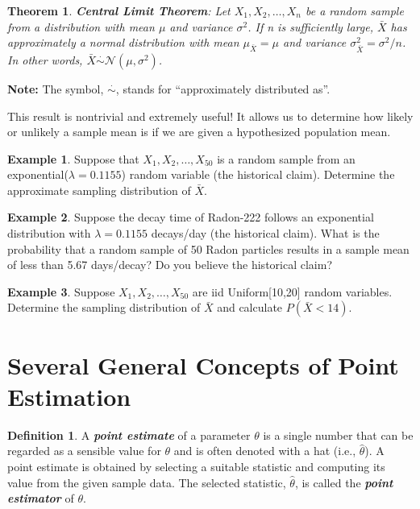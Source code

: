 \documentclass[
  11pt,
  oneside]{book}
\newtheorem{theorem}{Theorem}[chapter]
\theoremstyle{definition}
\newtheorem{definition}{Definition}[chapter]
\theoremstyle{definition}
\newtheorem{example}{Example}[chapter]
\theoremstyle{definition}
\theoremstyle{definition}
\theoremstyle{remark}
\begin{document}
\begin{theorem}
\textbf{\emph{Central Limit Theorem}}: Let \(X_1, X_2, \ldots, X_n\) be a random sample from a distribution with mean \(\mu\) and variance \(\sigma^2\). If n is sufficiently large, \(\bar{X}\) has approximately a normal distribution with mean \(\mu_{\bar{X}} = \mu\) and variance \(\sigma_{\bar{X}}^2 = \sigma^2/n\). In other words, \(\bar{X} \stackrel{\cdot}{\sim} \mathcal{N}(\mu,\sigma^2)\).
\end{theorem}

\textbf{Note:} The symbol, \(\stackrel{\cdot}{\sim}\), stands for ``approximately distributed as''.

This result is nontrivial and extremely useful! It allows us to determine how likely or unlikely a sample mean is if we are given a hypothesized population mean.

\begin{example}
Suppose that \(X_1, X_2, \ldots, X_{50}\) is a random sample from an exponential(\(\lambda = 0.1155\)) random variable (the historical claim). Determine the approximate sampling distribution of \(\bar{X}\).
\end{example}

\vfill

\newpage

\begin{example}
Suppose the decay time of Radon-222 follows an exponential distribution with \(\lambda = 0.1155\) decays/day (the historical claim). What is the probability that a random sample of 50 Radon particles results in a sample mean of less than 5.67 days/decay? Do you believe the historical claim?
\end{example}

\vfill

\begin{example}
Suppose \(X_1, X_2, \ldots, X_{50}\) are iid Uniform{[}10,20{]} random variables. Determine the sampling distribution of \(\bar{X}\) and calculate \(P(\bar{X}<14)\).
\end{example}

\vfill

\newpage

\section{Several General Concepts of Point Estimation}\label{several-general-concepts-of-point-estimation}

\begin{definition}
A \textbf{\emph{point estimate}} of a parameter \(\theta\) is a single number that can be regarded as a sensible value for \(\theta\) and is often denoted with a hat (i.e., \(\hat{\theta}\)). A point estimate is obtained by selecting a suitable statistic and computing its value from the given sample data. The selected statistic, \(\hat{\theta}\), is called the \textbf{\emph{point estimator}} of \(\theta\).
\end{definition}
\end{document}
